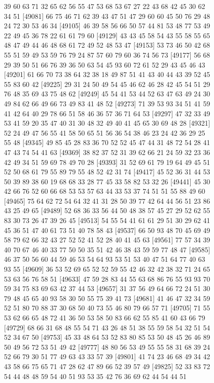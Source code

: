 \documentclass{article}
\begin{document}
\begin{figure}[H]
\begin{Schunk}
\begin{Soutput}
[49057] 39 60 63 71 32 65 62 56 55 47 53 68 53 67 27 22 43 68 42 45 30 62 34 51
[49081] 66 75 46 71 62 39 43 47 51 47 29 60 60 45 50 76 29 48 24 72 30 53 46 34
[49105] 46 39 58 56 66 50 57 44 81 53 48 77 53 49 22 49 45 36 78 22 61 61 79 60
[49129] 43 43 45 58 54 43 55 58 55 65 48 47 49 44 46 48 68 61 72 49 52 48 53 47
[49153] 53 73 46 50 42 68 55 51 59 49 53 59 76 79 24 87 57 60 79 60 36 74 56 73
[49177] 56 68 29 39 50 51 66 76 39 36 50 63 54 45 93 60 72 61 52 29 43 45 46 43
[49201] 61 66 70 73 38 64 32 38 18 49 87 51 41 43 40 44 43 39 52 45 55 83 60 42
[49225] 29 31 24 50 49 54 45 46 62 46 28 42 45 54 51 29 76 48 35 69 43 75 48 62
[49249] 45 54 41 53 44 52 63 47 63 49 24 30 49 84 62 66 49 66 73 49 83 41 48 52
[49273] 71 39 53 93 34 51 41 59 41 42 64 40 29 78 66 51 58 46 36 57 36 71 64 53
[49297] 47 32 33 49 53 41 59 20 35 47 40 31 30 48 32 49 40 41 45 65 30 69 48 28
[49321] 52 24 49 47 56 55 41 58 50 65 51 56 36 54 38 46 23 24 42 36 29 25 55 48
[49345] 49 85 45 28 83 36 70 52 52 45 47 44 31 48 72 54 28 41 47 43 74 54 41 63
[49369] 38 82 37 52 31 39 62 66 21 24 59 32 23 36 42 49 34 51 59 69 78 49 70 28
[49393] 31 52 69 61 79 19 64 49 45 51 52 50 68 61 79 55 89 79 55 48 52 42 31 74
[49417] 45 52 36 31 44 53 50 39 89 38 60 19 68 68 33 28 77 45 33 58 82 53 32 26
[49441] 45 30 42 66 76 52 60 66 68 53 53 57 63 44 33 53 37 74 51 51 55 88 49 60
[49465] 75 64 62 72 54 64 32 41 31 28 50 39 77 42 64 44 56 51 23 86 43 25 49 65
[49489] 52 68 36 33 56 44 50 48 38 57 45 27 29 52 62 55 83 30 73 26 47 39 26 45
[49513] 54 55 54 41 61 61 29 51 30 29 62 41 45 36 51 47 40 61 73 51 40 78 58 43
[49537] 66 50 93 48 70 45 69 49 58 79 62 66 32 43 27 52 52 41 52 28 40 41 45 63
[49561] 77 57 34 39 40 70 67 46 40 33 77 50 50 35 51 42 46 38 43 59 59 77 48 47
[49585] 46 37 50 56 60 44 59 46 53 54 64 93 53 51 53 40 47 51 64 77 40 63 93 55
[49609] 36 53 52 69 65 52 52 59 55 42 46 32 42 38 32 71 24 65 53 63 56 76 58 51
[49633] 47 59 28 83 44 55 63 68 86 76 55 93 93 70 59 34 75 83 69 63 42 37 44 53
[49657] 31 37 56 49 64 66 72 24 51 30 79 48 45 65 40 93 58 30 50 55 75 39 41 73
[49681] 41 46 47 32 34 59 52 51 80 70 88 37 30 68 50 40 73 55 46 80 79 66 57 71
[49705] 71 55 53 62 66 65 48 72 41 36 50 53 58 50 83 66 62 55 85 41 60 43 66 79
[49729] 68 66 31 68 48 55 54 71 43 26 48 51 38 55 59 58 54 32 51 54 52 34 67 50
[49753] 45 33 48 64 53 52 83 80 85 53 50 48 45 26 46 89 50 49 56 72 53 51 49 42
[49777] 48 80 56 53 49 55 55 58 31 68 39 24 52 66 79 30 51 77 49 63 43 33 57 39
[49801] 41 74 23 46 68 49 34 42 43 58 66 75 65 71 47 28 62 47 89 66 52 39 57 49
[49825] 52 33 83 72 54 44 48 48 59 54 40 51 93 53 35 42 76 36 69 62 44 54 44 51

\end{Soutput}
\end{Schunk}
\end{figure}
\end{document}
